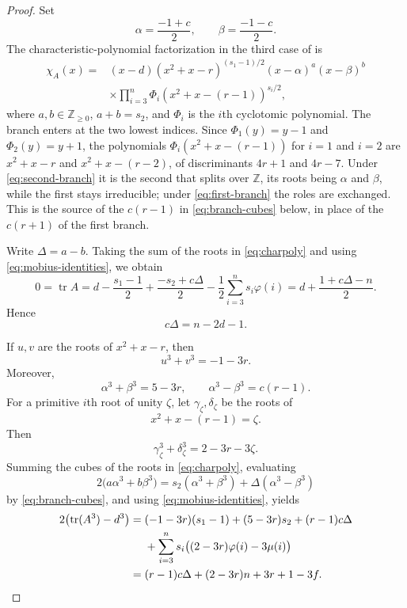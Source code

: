 \documentclass[11pt]{amsart}
\DeclareMathOperator{\tr}{tr}
\begin{document}
\begin{proof}
Set
\[
  \alpha=\frac{-1+c}{2},
  \qquad
  \beta=\frac{-1-c}{2}.
\]
The characteristic-polynomial factorization in the third case of
\cite[proof of Theorem~2]{LM} is
\begin{equation}\label{eq:charpoly}
\begin{split}
  \chi_A(x)={}&(x-d)(x^2+x-r)^{(s_1-1)/2}
  (x-\alpha)^a(x-\beta)^b\\
  &\times
  \prod_{i=3}^{n}
  \Phi_i\!\left(x^2+x-(r-1)\right)^{s_i/2},
\end{split}
\end{equation}
where $a,b\in\mathbb{Z}_{\geq 0}$, $a+b=s_2$, and $\Phi_i$ is the
$i$th cyclotomic polynomial. The branch enters at the two lowest
indices. Since $\Phi_1(y)=y-1$ and $\Phi_2(y)=y+1$, the polynomials
$\Phi_i\!\left(x^2+x-(r-1)\right)$ for $i=1$ and $i=2$ are
$x^2+x-r$ and $x^2+x-(r-2)$, of discriminants $4r+1$ and $4r-7$.
Under \eqref{eq:second-branch} it is the second that splits over
$\mathbb{Z}$, its roots being $\alpha$ and $\beta$, while the first
stays irreducible; under \eqref{eq:first-branch} the roles are
exchanged. This is the source of the $c(r-1)$ in
\eqref{eq:branch-cubes} below, in place of the $c(r+1)$ of the first
branch.

Write $\Delta=a-b$. Taking the sum of the roots in
\eqref{eq:charpoly} and using
\eqref{eq:mobius-identities}, we obtain
\[
  0=\tr A
  =d-\frac{s_1-1}{2}+\frac{-s_2+c\Delta}{2}
   -\frac12\sum_{i=3}^{n}s_i\varphi(i)
  =d+\frac{1+c\Delta-n}{2}.
\]
Hence
\begin{equation}\label{eq:delta}
  c\Delta=n-2d-1.
\end{equation}

If $u,v$ are the roots of $x^2+x-r$, then
\[
  u^3+v^3=-1-3r.
\]
Moreover,
\begin{equation}\label{eq:branch-cubes}
  \alpha^3+\beta^3=5-3r,
  \qquad
  \alpha^3-\beta^3=c(r-1).
\end{equation}
For a primitive $i$th root of unity $\zeta$, let
$\gamma_\zeta,\delta_\zeta$ be the roots of
\[
  x^2+x-(r-1)=\zeta.
\]
Then
\[
  \gamma_\zeta^3+\delta_\zeta^3=2-3r-3\zeta.
\]
Summing the cubes of the roots in \eqref{eq:charpoly}, evaluating
\[
  2\bigl(a\alpha^3+b\beta^3\bigr)
  =s_2(\alpha^3+\beta^3)+\Delta(\alpha^3-\beta^3)
\]
by \eqref{eq:branch-cubes}, and using \eqref{eq:mobius-identities},
yields
\begin{align}
  2\bigl(\tr(A^3)-d^3\bigr)
  ={}&(-1-3r)(s_1-1)+(5-3r)s_2+(r-1)c\Delta
  \notag\\
  &+\sum_{i=3}^{n}s_i
  \bigl((2-3r)\varphi(i)-3\mu(i)\bigr)
  \notag\\
  ={}&(r-1)c\Delta+(2-3r)n+3r+1-3f.
  \label{eq:spectral-cubic}
\end{align}


\end{proof}
\end{document}
